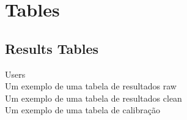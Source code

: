 
\chapter{Tables}
\label{appendix:tables}
%
\section{Results Tables}
\label{appendix:sec_results}
%
Users \\
Um exemplo de uma tabela de resultados raw \\
Um exemplo de uma tabela de resultados clean \\
Um exemplo de uma tabela de calibração \\
